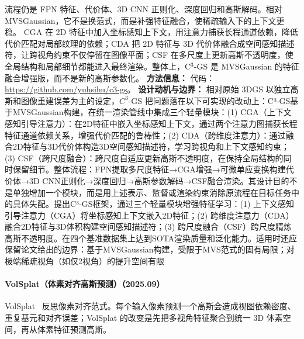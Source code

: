 流程仍是 FPN 特征、代价体、3D CNN 正则化、深度回归和高斯解码。相对 MVSGaussian，它不是换范式，而是补强特征融合，使稀疏输入下的上下文更稳。
CGA 在 2D 特征中加入坐标感知上下文，用注意力捕获长程通道依赖，降低代价匹配对局部纹理的依赖；CDA 把 2D 特征与 3D 代价体融合成空间感知描述符，让跨视角约束不仅停留在图像平面；CSF 在多尺度上更新高斯不透明度，使全局结构和局部细节都能进入最终渲染。整体上，C$^3$-GS 是 MVSGaussian 的特征融合增强版，而不是新的高斯参数化。
\textbf{方法信息：} 代码：\url{https://github.com/yuhsihu/c3-gs}。
\textbf{设计动机与边界：} 相对原始 3DGS 以独立高斯和图像重建误差为主的设定，${C}^{3}$-GS 把问题落在以下可实现的改动上：C³-GS基于MVSGaussian构建，在统一渲染管线中集成三个轻量模块：(1) CGA（上下文感知引导注意力）：在2D特征中嵌入坐标感知上下文，通过两个注意力图捕获长程特征通道依赖关系，增强代价匹配的鲁棒性；(2) CDA（跨维度注意力）：通过融合2D特征与3D代价体构造3D空间感知描述符，学习跨视角和上下文感知约束；(3) CSF（跨尺度融合）：跨尺度自适应更新高斯不透明度，在保持全局结构的同时保留细节。整体流程：FPN提取多尺度特征→CGA增强→可微单应变换构建代价体→3D CNN正则化→深度回归→高斯参数解码→CSF融合渲染。其设计目的不是单独增加一个模块，而是用上述表示、监督或渲染约束消除原流程在目标任务中的具体失配。提出C³-GS框架，通过三个轻量模块增强特征学习：(1) 上下文感知引导注意力（CGA）将坐标感知上下文嵌入2D特征；(2) 跨维度注意力（CDA）融合2D特征与3D体积构建空间感知描述符；(3) 跨尺度融合（CSF）跨尺度精炼高斯不透明度。在四个基准数据集上达到SOTA渲染质量和泛化能力。适用时还应保留论文给出的边界：基于MVSGaussian构建，受限于MVS范式的固有局限；对极端稀疏视角（如仅2视角）的提升空间有限
\paragraph{VolSplat（体素对齐高斯预测）（2025.09）}
VolSplat~\cite{2509_19297} 反思像素对齐范式。每个输入像素预测一个高斯会造成视图依赖密度、重复基元和对齐误差；VolSplat 的改变是先把多视角特征聚合到统一 3D 体素空间，再从体素特征预测高斯。

